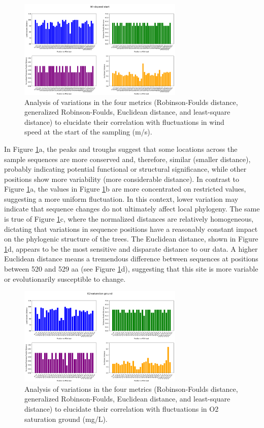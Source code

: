 \begin{figure}[]
    \centering
    \includegraphics[width=0.7\textwidth]{figure5.png}
    \caption{Analysis of variations in the four metrics (Robinson-Foulds distance, generalized Robinson-Foulds, Euclidean distance, and least-square distance) to elucidate their correlation with fluctuations in wind speed at the start of the sampling (m/s). \label{fig:fig5}}
\end{figure}

In Figure \ref{fig:fig5}a, the peaks and troughs suggest that some locations across the sample sequences are more conserved and, therefore, similar (smaller distance), probably indicating potential functional or structural significance, while other positions show more variability (more considerable distance). In contrast to Figure \ref{fig:fig5}a, the values in Figure \ref{fig:fig5}b are more concentrated on restricted values, suggesting a more uniform fluctuation. In this context, lower variation may indicate that sequence changes do not ultimately affect local phylogeny. The same is true of Figure \ref{fig:fig5}c, where the normalized distances are relatively homogeneous, dictating that variations in sequence positions have a reasonably constant impact on the phylogenic structure of the trees. The Euclidean distance, shown in Figure \ref{fig:fig5}d, appears to be the most sensitive and disparate distance to our data. A higher Euclidean distance means a tremendous difference between sequences at positions between 520 and 529 aa (see Figure \ref{fig:fig5}d), suggesting that this site is more variable or evolutionarily susceptible to change. 

\begin{figure}[]
    \centering
    \includegraphics[width=0.7\textwidth]{figure6.png}
    \caption{Analysis of variations in the four metrics (Robinson-Foulds distance, generalized Robinson-Foulds, Euclidean distance, and least-square distance) to elucidate their correlation with fluctuations in O2 saturation ground (mg/L). \label{fig:fig6}}
\end{figure}

